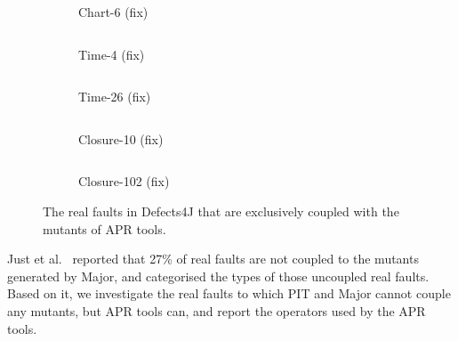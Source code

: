 \documentclass[conference]{IEEEtran}
\def\d4j{Defects4J\xspace}
\begin{document}
\begin{figure}[!ht]
    \begin{subfigure}{\linewidth}
        \centering
        \inputminted[escapeinside=||]{diff}{figures/diff/statement_deletion.diff}
        \caption{Chart-6 (fix)}
        \label{fig:chart_6_diff}
        \vspace{1em}
    \end{subfigure}

    \begin{subfigure}{\linewidth}
        \centering
        \inputminted[escapeinside=||]{diff}{figures/diff/argument_swapping.diff}
        \caption{Time-4 (fix)}
        \label{fig:time_4_diff}
        \vspace{1em}
    \end{subfigure}

    \begin{subfigure}{\linewidth}
        \centering
        \inputminted[escapeinside=||]{diff}{figures/diff/argument_omission.diff}
        \caption{Time-26 (fix)}
        \label{fig:time_26_diff}
        \vspace{1em}
    \end{subfigure}
    
    \begin{subfigure}{\linewidth}
        \centering
        \inputminted[escapeinside=||]{diff}{figures/diff/similar_method_called.diff}
        \caption{Closure-10 (fix)}
        \label{fig:closure_10_diff}
        \vspace{1em}
    \end{subfigure}
    
    \begin{subfigure}{\linewidth}
        \centering
        \inputminted[escapeinside=||]{diff}{figures/diff/statement_shifting.diff}
        \caption{Closure-102 (fix)}
        \label{fig:closure_102_diff}        
    \end{subfigure}

    \caption{The real faults in \d4j that are exclusively coupled with the mutants of APR tools.}
    \label{fig:qualitative_study}
\end{figure}

Just et al.~\cite{just2014mutants} reported that 27\% of real faults are not
coupled to the mutants generated by Major, and categorised the types of those 
uncoupled real faults. Based on it, we investigate the real faults to which PIT 
and Major cannot couple any mutants, but APR tools can, and report the 
operators used by the APR tools.
\end{document}
